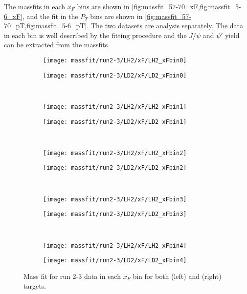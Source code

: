 \documentclass[../main.tex]{subfiles}
\begin{document}
	
The massfits in each $x_F$ bins are shown in \cref{fig:massfit_57-70_xF,fig:massfit_5-6_xF}, 
and the fit in the $P_T$ bins are shown in \cref{fig:massfit_57-70_pT,fig:massfit_5-6_pT}.
The two datasets are analysis separately. The data in each bin is well described by the fitting procedure
and the $J/\psi$ and $\psi'$ yield can be extracted from the massfits.
\begin{figure}
	\centering
	\begin{subfigure}{0.4\linewidth}
		\texttt{[image: massfit/run2-3/LH2/xF/LH2\_xFbin0]}
	\end{subfigure}
	\begin{subfigure}{0.4\linewidth}
		\texttt{[image: massfit/run2-3/LD2/xF/LD2\_xFbin0]}
	\end{subfigure}\\
	\begin{subfigure}{0.4\linewidth}
		\texttt{[image: massfit/run2-3/LH2/xF/LH2\_xFbin1]}
	\end{subfigure}
	\begin{subfigure}{0.4\linewidth}
		\texttt{[image: massfit/run2-3/LD2/xF/LD2\_xFbin1]}
	\end{subfigure}\\
	\begin{subfigure}{0.4\linewidth}
		\texttt{[image: massfit/run2-3/LH2/xF/LH2\_xFbin2]}
	\end{subfigure}
	\begin{subfigure}{0.4\linewidth}
		\texttt{[image: massfit/run2-3/LD2/xF/LD2\_xFbin2]}
	\end{subfigure}\\
	\begin{subfigure}{0.4\linewidth}
		\texttt{[image: massfit/run2-3/LH2/xF/LH2\_xFbin3]}
	\end{subfigure}
	\begin{subfigure}{0.4\linewidth}
		\texttt{[image: massfit/run2-3/LD2/xF/LD2\_xFbin3]}
	\end{subfigure}\\
	\begin{subfigure}{0.4\linewidth}
		\texttt{[image: massfit/run2-3/LH2/xF/LH2\_xFbin4]}
	\end{subfigure}
	\begin{subfigure}{0.4\linewidth}
		\texttt{[image: massfit/run2-3/LD2/xF/LD2\_xFbin4]}
	\end{subfigure}
	\caption{Mass fit for run 2-3 data in each $x_F$ bin for both (left) and (right) targets. }
	\label{fig:massfit_57-70_xF}
\end{figure}
\end{document}
